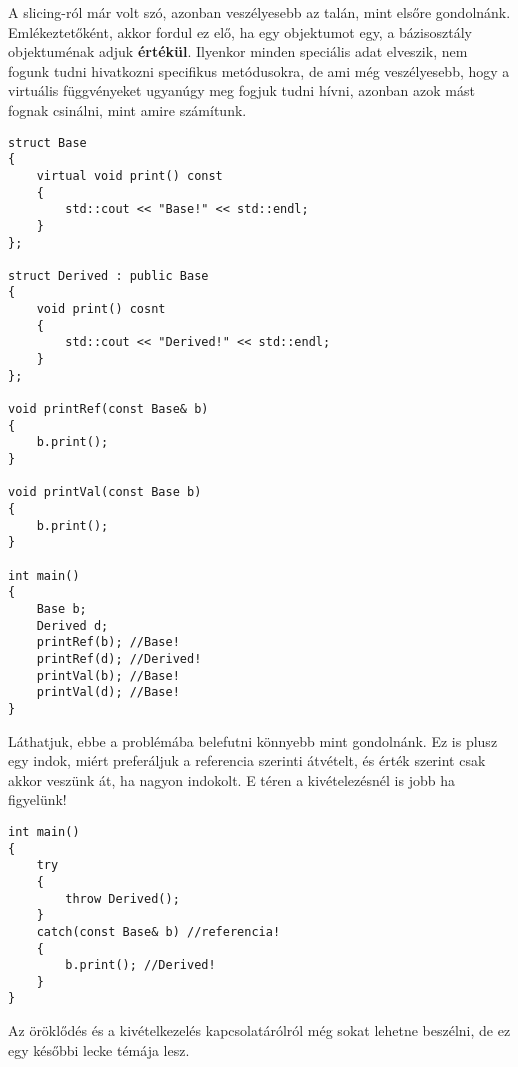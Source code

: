 \documentclass[a4paper,11.5pt,table]{article}
\begin{document}
	A slicing-ról már volt szó, azonban veszélyesebb az talán, mint elsőre gondolnánk. Emlékeztetőként, akkor fordul ez elő, ha egy objektumot egy, a bázisosztály objektuménak adjuk \textbf{értékül}. Ilyenkor minden speciális adat elveszik, nem fogunk tudni hivatkozni specifikus metódusokra, de ami még veszélyesebb, hogy a virtuális függvényeket ugyanúgy meg fogjuk tudni hívni, azonban azok mást fognak csinálni, mint amire számítunk.
	\begin{lstlisting}
struct Base
{
	virtual void print() const
	{
		std::cout << "Base!" << std::endl;
	}	
};

struct Derived : public Base
{
	void print() cosnt
	{
		std::cout << "Derived!" << std::endl;
	}	
};

void printRef(const Base& b)
{
	b.print();
}

void printVal(const Base b)
{
	b.print();
}

int main()
{
	Base b;
	Derived d;
	printRef(b); //Base!
	printRef(d); //Derived!
	printVal(b); //Base!
	printVal(d); //Base!
}
	\end{lstlisting}
	Láthatjuk, ebbe a problémába belefutni könnyebb mint gondolnánk. Ez is plusz egy indok, miért preferáljuk a referencia szerinti átvételt, és érték szerint csak akkor veszünk át, ha nagyon indokolt. E téren a kivételezésnél is jobb ha figyelünk!
	\begin{lstlisting}
int main()
{
	try
	{
		throw Derived();
	}
	catch(const Base& b) //referencia!
	{
		b.print(); //Derived!
	}
}
	\end{lstlisting}
	Az öröklődés és a kivételkezelés kapcsolatárólról még sokat lehetne beszélni, de ez egy későbbi lecke témája lesz.
\end{document}
